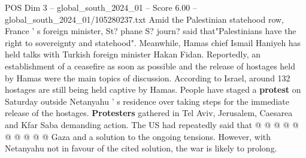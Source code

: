 \begin{textsample}{POS Dim 3 – global\_south\_2024\_01 – Score 6.00 – global\_south\_2024\_01/105280237.txt}
Amid the Palestinian statehood row, France ' s foreign minister, St? phane S? journ? said that"Palestinians have the right to sovereignty and statehood".
Meanwhile, Hamas chief Ismail Haniyeh has held talks with Turkish foreign minister Hakan Fidan.
Reportedly, an establishment of a ceasefire as soon as possible and the release of hostages held by Hamas were the main topics of discussion.
According to Israel, around 132 hostages are still being held captive by Hamas.
People have staged a \textbf{protest} on Saturday outside Netanyahu ' s residence over taking steps for the immediate release of the hostages. \textbf{Protesters} gathered in Tel Aviv, Jerusalem, Caesarea and Kfar Saba demanding action.
The US had repeatedly said that @ @ @ @ @ @ @ @ @ @ Gaza and a solution to the ongoing tensions.
However, with Netanyahu not in favour of the cited solution, the war is likely to prolong.

\end{textsample}

